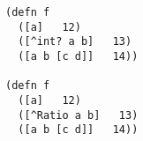 \begin{lstlisting}[style=reclojureClojure,frame=single]
(defn f
  ([a]   12)
  ([^int? a b]   13)
  ([a b [c d]]   14))

(defn f
  ([a]   12)
  ([^Ratio a b]   13)
  ([a b [c d]]   14))
\end{lstlisting}
